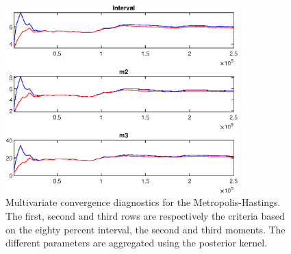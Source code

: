  
\begin{figure}[H]
\centering 
\includegraphics[width=0.8\textwidth]{two_sector_RBC_differentiated_est/Output/two_sector_RBC_differentiated_est_mdiag}
\caption{Multivariate convergence diagnostics for the Metropolis-Hastings.
The first, second and third rows are respectively the criteria based on
the eighty percent interval, the second and third moments. The different 
parameters are aggregated using the posterior kernel.}\label{Fig:MultivariateDiagnostics}
\end{figure}

